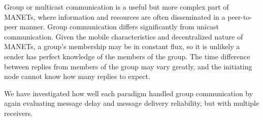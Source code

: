 \documentclass[lnicst]{svmultln}
\begin{document}
Group or multicast communication is a useful but more complex part of MANETs, where information and resources are often disseminated in a peer-to-peer manner. Group communication differs significantly from unicast communication. Given the mobile characteristics and decentralized nature of MANETs, a group's membership may be in constant flux, so it is unlikely a sender has perfect knowledge of the members of the group. The time difference between replies from members of the group may vary greatly, and the initiating node cannot know how many replies to expect.

We have investigated how well each paradigm handled group communication by again evaluating message delay and message delivery reliability, but with multiple receivers.




\end{document}
